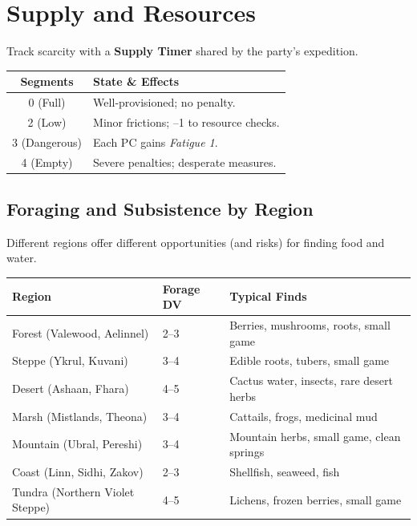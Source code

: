 \section{Supply and Resources}
\label{sec:supply}
Track scarcity with a \textbf{Supply Timer } shared by the party's expedition.
\begin{center}
\begin{longtable}{cl}
\toprule
\textbf{Segments} & \textbf{State \& Effects} \\
\midrule
0 (Full) & Well‑provisioned; no penalty. \\
2 (Low) & Minor frictions; --1 to resource checks. \\
3 (Dangerous) & Each PC gains \emph{Fatigue 1}. \\
4 (Empty) & Severe penalties; desperate measures. \\
\bottomrule
\end{longtable}
\end{center}

\subsection*{Foraging and Subsistence by Region}
\label{sec:foraging}

Different regions offer different opportunities (and risks) for finding food and water.

\begin{center}
\begin{longtable}{lll}
\toprule
\textbf{Region} & \textbf{Forage DV} & \textbf{Typical Finds} \\
\midrule
Forest (Valewood, Aelinnel) & 2--3 & Berries, mushrooms, roots, small game \\
Steppe (Ykrul, Kuvani) & 3--4 & Edible roots, tubers, small game \\
Desert (Ashaan, Fhara) & 4--5 & Cactus water, insects, rare desert herbs \\
Marsh (Mistlands, Theona) & 3--4 & Cattails, frogs, medicinal mud \\
Mountain (Ubral, Pereshi) & 3--4 & Mountain herbs, small game, clean springs \\
Coast (Linn, Sidhi, Zakov) & 2--3 & Shellfish, seaweed, fish \\
Tundra (Northern Violet Steppe) & 4--5 & Lichens, frozen berries, small game \\
\bottomrule
\end{longtable}
\end{center}

